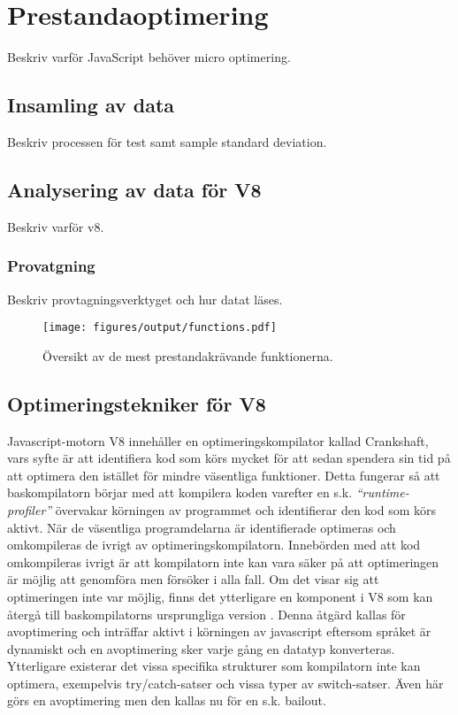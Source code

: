 \section{Prestandaoptimering}

Beskriv varför JavaScript behöver micro optimering.

\subsection{Insamling av data}

Beskriv processen för test samt sample standard deviation.

\subsection{Analysering av data för V8}

Beskriv varför v8.

\subsubsection{Provatgning}

Beskriv provtagningsverktyget och hur datat läses.

\begin{figure}[ht]
  \texttt{[image: figures/output/functions.pdf]}
  \caption{Översikt av de mest prestandakrävande funktionerna.}
\end{figure}

\subsection{Optimeringstekniker för V8}

Javascript-motorn V8 innehåller en optimeringskompilator kallad Crankshaft,
vars syfte är att identifiera kod som körs mycket för att sedan spendera sin
tid på att optimera den istället för mindre väsentliga funktioner. Detta
fungerar så att baskompilatorn börjar med att kompilera koden varefter en
s.k. \textit{``runtime-profiler''} övervakar körningen av programmet och
identifierar den kod som körs aktivt. När de väsentliga programdelarna är
identifierade optimeras och omkompileras de ivrigt av optimeringskompilatorn.
Innebörden med att kod omkompileras ivrigt är att kompilatorn inte kan vara
säker på att optimeringen är möjlig att genomföra men försöker i alla fall. Om
det visar sig att optimeringen inte var möjlig, finns det ytterligare en
komponent i V8 som kan återgå till baskompilatorns ursprungliga version
\citep{mk10}. Denna åtgärd kallas för avoptimering och inträffar aktivt i
körningen av javascript eftersom språket är dynamiskt och en avoptimering sker
varje gång en datatyp konverteras. Ytterligare existerar det vissa specifika
strukturer som kompilatorn inte kan optimera, exempelvis try/catch-satser och
vissa typer av switch-satser. Även här görs en avoptimering men den kallas
nu för en s.k. bailout.

